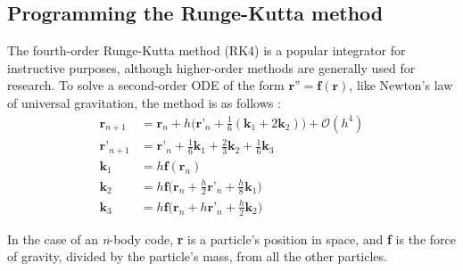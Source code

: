 \documentclass{article}
\begin{document}
\subsection{Programming the Runge-Kutta method}

The fourth-order Runge-Kutta method (RK4) is a popular integrator for instructive purposes, although higher-order methods are generally used for research. To solve a second-order ODE of the form $\textbf{r''} = \textbf{f}(\textbf{r})$, like Newton's law of universal gravitation, the method is as follows \cite{olver1965handbook}:
\begin{align}
  \textbf{r}_{n+1} &= \textbf{r}_n + h\bigg(\textbf{r'}_n + \frac{1}{6}(\textbf{k}_1 + 2\textbf{k}_2)\bigg) + \mathcal{O}(h^4) \\
  \textbf{r'}_{n+1} &= \textbf{r'}_n + \frac{1}{6}\textbf{k}_1 + \frac{2}{3}\textbf{k}_2 + \frac{1}{6}\textbf{k}_3 \\
  \textbf{k}_1 &= h\textbf{f}(\textbf{r}_n) \\
  \textbf{k}_2 &= h\textbf{f}\bigg(\textbf{r}_n + \frac{h}{2}\textbf{r'}_n + \frac{h}{8}\textbf{k}_1\bigg) \\
  \textbf{k}_3 &= h\textbf{f}\bigg(\textbf{r}_n + h\textbf{r'}_n + \frac{h}{2}\textbf{k}_2\bigg)
\end{align}

In the case of an \textit{n}-body code, \textbf{r} is a particle's position in space, and \textbf{f} is the force of gravity, divided by the particle's mass, from all the other particles.
\end{document}
